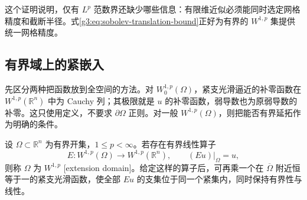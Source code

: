 这个证明说明，仅有 \(L^p\) 范数界还缺少哪些信息：有限维近似必须能同时选定网格精度和截断半径。式\eqref{g3:eq:sobolev-translation-bound}正好为有界的 \(W^{1,p}\) 集提供统一网格精度。

\subsection{有界域上的紧嵌入}
\label{g3:subsec:1105:02}
先区分两种把函数放到全空间的方法。对 \(W^{1,p}_0(\Omega)\)，紧支光滑逼近的补零函数在 \(W^{1,p}(\mathbb R^n)\) 中为 Cauchy 列；其极限就是 \(u\) 的补零函数，弱导数也为原弱导数的补零。这只使用定义，不要求 \(\partial\Omega\) 正则。对一般 \(W^{1,p}(\Omega)\)，则把能否有界延拓作为明确的条件。

\begin{definition}\label{g3:def:sobolev-extension-domain}
	设 \(\Omega\subset\mathbb R^n\) 为有界开集，\(1\le p<\infty\)。若存在有界线性算子
	\[
		E:W^{1,p}(\Omega)\longrightarrow W^{1,p}(\mathbb R^n),
		\qquad(Eu)|_\Omega=u,
	\]
	则称 \(\Omega\) 为 \(W^{1,p}\) [extension domain]。给定这样的算子后，可再乘一个在 \(\overline\Omega\) 附近恒等于一的紧支光滑函数，使全部 \(Eu\) 的支集位于同一个紧集内，同时保持有界性与线性。
\end{definition}

